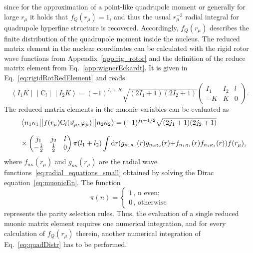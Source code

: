 since for the approximation of a point-like quadrupole moment or generally for large $r_\mu$ it holds that $f_Q(r_\mu)=1$, and thus the usual $r_\mu^{-3}$ radial integral for quadrupole hyperfine structure is recovered. Accordingly, $f_Q(r_\mu)$ describes the finite distribution of the quadrupole moment inside the nucleus. The reduced matrix element in the nuclear coordinates can be calculated with the rigid rotor wave functions from Appendix~\ref{app:rig_rotor} and the definition of the reduce matrix element from Eq.~\eqref{app:wignerEckardt}. It is given in Eq.~\eqref{eq:rigidRotRedElement} and reads
\begin{equation}
\left< I_1K\middle|\middle|\text{C}_l\middle|\middle|I_2K\right>=(-1)^{I_2+K}
\sqrt{(2I_1+1)(2I_2+1)}
\left(
\begin{matrix}
I_1&I_2&l\\
-K&K&0
\end{matrix}
\right).
\end{equation}
The reduced matrix elements in the muonic variables can be evaluated as~\cite{johnson2007}
\begin{alignat}{2}
&&&\left< n_1\kappa_1\big{|}\big{|}f(r_\mu)\text{C}_l(\vartheta_\mu,\varphi_\mu) \big{|}\big{|}n_2\kappa_2\right> =
 (-1)^{j_1+1/2} \sqrt{(2j_1+1)(2j_2+1)}
\notag\\[7.5pt]
&&&\times
\left(
\begin{matrix}
j_1&j_2&l\\
-\frac{1}{2}&\frac{1}{2}&0
\end{matrix}
\right)\pi(l_1+l_2)\int \text{d}r ({g_{n_1\kappa_1}(r)g_{n_2\kappa_2}(r)}{+}{f_{n_1\kappa_1}(r)f_{n_2\kappa_2}(r)}) f(r_\mu),
\end{alignat}
where $f_{n\kappa}(r_\mu)$ and $g_{n\kappa}(r_\mu)$ are the radial wave functions~\eqref{eq:radial_equations_small} obtained by solving the Dirac equation~\eqref{eq:muonicEn}.
The function
\begin{equation}
\label{eq:parityFunc}
\pi(n) =
\left\{
\begin{matrix}
1\,\text{, n even;}\phantom{11}\\
0\,\text{, otherwise}
\end{matrix}
\right.
\end{equation}
represents the parity selection rules.
Thus, the evaluation of a single reduced muonic matrix element requires one numerical integration, and for every calculation of $f_Q(r_\mu)$ therein, another numerical integration of Eq.~\eqref{eq:quadDistr} has to be performed.

